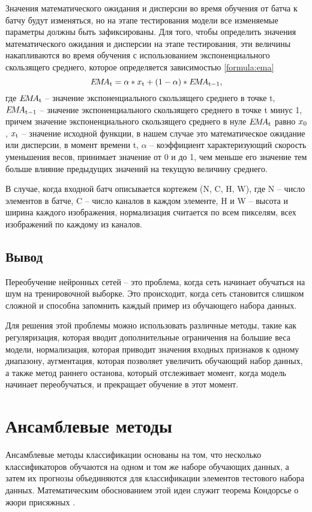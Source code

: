 Значения математического ожидания и дисперсии во время обучения от батча к батчу будут изменяться, но на этапе тестирования модели все изменяемые параметры должны быть зафиксированы. Для того, чтобы определить значения математического ожидания и дисперсии на этапе тестирования, эти величины накапливаются во время обучения с использованием экспоненциального скользящего среднего, которое определяется зависимостью \ref{formula:ema} \begin{equation}\label{formula:ema}
E\!M\!A_{\rm{t}} = \alpha * x_{\rm{t}} + (1 - \alpha) * E\!M\!A_{\rm{t-1}},
\end{equation}
где $E\!M\!A_{\rm{t}}$ -- значение экспоненциального скользящего среднего в точке t, $E\!M\!A_{\rm{t-1}}$ -- значение экспоненциального скользящего среднего в точке t минус 1, причем значение экспоненциального скользящего среднего в нуле $E\!M\!A_{\rm{t}}$ равно $x_{\rm{0}}$, $x_{\rm{t}}$ -- значение исходной функции, в нашем случае это математическое ожидание или дисперсии, в момент времени t, $\alpha$ -- коэффициент характеризующий скорость уменьшения весов, принимает значение от 0 и до 1, чем меньше его значение тем больше влияние предыдущих значений на текущую величину среднего.

В случае, когда входной батч описывается кортежем (N, C, H, W), где N -- число элементов в батче, C -- число каналов в каждом элементе, H и W -- высота и ширина каждого изображения, нормализация считается по всем пикселям, всех изображений по каждому из каналов.

\subsection{Вывод}
Переобучение нейронных сетей -- это проблема, когда сеть начинает обучаться на шум на тренировочной выборке. Это происходит, когда сеть становится слишком сложной и способна запомнить каждый пример из обучающего набора данных. 

Для решения этой проблемы можно использовать различные методы, такие как регуляризация, которая вводит дополнительные ограничения на большие веса модели, нормализация, которая приводит значения входных признаков к одному диапазону, аугментация, которая позволяет увеличить обучающий набор данных, а также метод раннего останова, который отслеживает момент, когда модель начинает переобучаться, и прекращает обучение в этот момент.


\section{Ансамблевые методы}
Ансамблевые методы классификации основаны на том, что несколько классификаторов обучаются на одном и том же наборе обучающих данных, а затем их прогнозы объединяются для классификации элементов тестового набора данных. Математическим обоснованием этой идеи служит теорема Кондорсье о жюри присяжных \cite{ansambles}.

